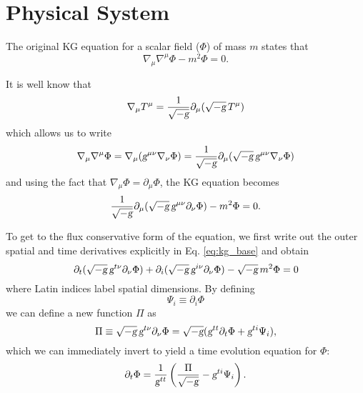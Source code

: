 \section{Physical System}

The original KG equation for a scalar field ($\Phi$) of mass $m$ states that
%
\begin{equation}
  \nabla_{\mu}\nabla^{\mu}\Phi - m^2\Phi = 0.
\end{equation}

It is well know that~\cite{wald1984}
%
\begin{equation}
  \nabla_{\mu}T^{\mu}  = \frac{1}{\sqrt{-\textsl{g}}}\partial_{\mu}(\sqrt{-\textsl{g}}\,T^{\mu})
\end{equation}
%
which allows us to write
%
\begin{equation}
  \nabla_{\mu}\nabla^{\mu}\Phi = \nabla_{\mu}(\textsl{g}^{\mu\nu}\nabla_\nu\Phi) = \frac{1}{\sqrt{-\textsl{g}}}\partial_{\mu}(\sqrt{-\textsl{g}}\,\textsl{g}^{\mu\nu}\nabla_\nu\Phi)
\end{equation}
%
and using the fact that $\nabla_\mu\Phi = \partial_\mu\Phi$, the KG equation becomes
%
\begin{equation}
  \frac{1}{\sqrt{-\textsl{g}}}\partial_{\mu}(\sqrt{-\textsl{g}}\,\textsl{g}^{\mu\nu}\partial_\nu\Phi) - m^2\Phi = 0.
  \label{eq:kg_base}
\end{equation}

To get to the flux conservative form of the equation, we first write out the outer spatial and time derivatives explicitly in Eq. \eqref{eq:kg_base} and obtain
%
\begin{equation}
  \partial_{t}(\sqrt{-\textsl{g}}\,\textsl{g}^{t\nu}\partial_\nu\Phi) + \partial_{i}(\sqrt{-\textsl{g}}\,\textsl{g}^{i \nu}\partial_\nu\Phi) - \sqrt{-\textsl{g}}\,m^2\Phi = 0
\end{equation}
%
where Latin indices label spatial dimensions. By defining
%
\begin{equation}
  \Psi_i \equiv \partial_i\Phi
  \label{eq:def_psi_i}
\end{equation}
%
we can define a new function $\Pi$ as
%
\begin{equation}
  \Pi \equiv \sqrt{-\textsl{g}}\,\textsl{g}^{t\nu}\partial_\nu\Phi = \sqrt{-\textsl{g}}(\textsl{g}^{tt}\partial_t\Phi + \textsl{g}^{ti}\Psi_i),
\end{equation}
%
which we can immediately invert to yield a time evolution equation for $\Phi$:
%
\begin{equation}
  \partial_t\Phi = \frac{1}{\textsl{g}^{tt}}\left( \frac{\Pi}{\sqrt{-\textsl{g}}} - \textsl{g}^{ti}\Psi_i \right).
  \label{eq:volution_for_phi}
\end{equation}

